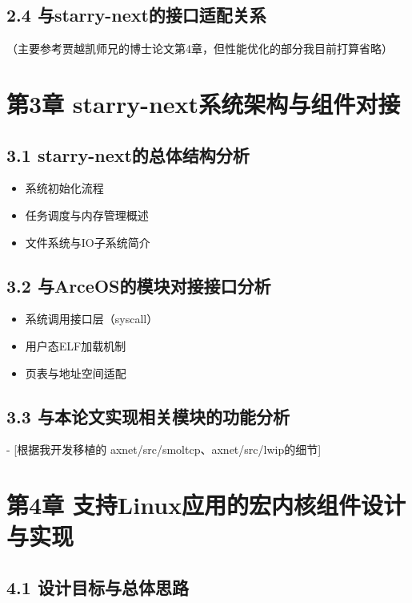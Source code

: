 \documentclass{article}
\begin{document}
\subsection{2.4 与starry-next的接口适配关系}

（主要参考贾越凯师兄的博士论文第4章，但性能优化的部分我目前打算省略）

\section{第3章 starry-next系统架构与组件对接}

\subsection{3.1 starry-next的总体结构分析}

\begin{itemize}
    \item 系统初始化流程
    \item 任务调度与内存管理概述
    \item 文件系统与IO子系统简介
\end{itemize}

\subsection{3.2 与ArceOS的模块对接接口分析}

\begin{itemize}
    \item 系统调用接口层（syscall）
    \item 用户态ELF加载机制
    \item 页表与地址空间适配
\end{itemize}

\subsection{3.3 与本论文实现相关模块的功能分析}

- [根据我开发移植的 axnet/src/smoltcp、axnet/src/lwip的细节]

\section{第4章 支持Linux应用的宏内核组件设计与实现}

\subsection{4.1 设计目标与总体思路}
\end{document}
